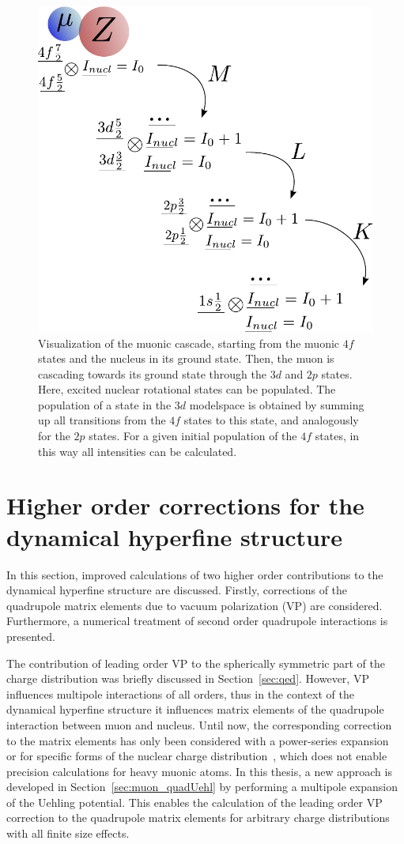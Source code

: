 %
\begin{figure}%
\centering
\includegraphics[width=0.82\linewidth]{pics/cascade.pdf}%
\caption{Visualization of the muonic cascade, starting from the muonic $4f$ states and the nucleus in its ground state. Then, the muon is cascading towards its ground state through the $3d$ and $2p$ states. Here, excited nuclear rotational states can be populated. The population of a state in the $3d$ modelspace is obtained by summing up all transitions from the $4f$ states to this state, and analogously for the $2p$ states. For a given initial population of the $4f$ states, in this way all intensities can be calculated.}%
\label{fig:cascade}%
\end{figure}
%
\newpage
\section{Higher order corrections for the dynamical hyperfine structure}
\label{sec:higherorder}
In this section, improved calculations of two higher order contributions to the dynamical hyperfine structure are discussed. Firstly, corrections of the quadrupole matrix elements due to vacuum polarization (VP) are considered. Furthermore, a numerical treatment of second order quadrupole interactions is presented.

The contribution of leading order VP to the spherically symmetric part of the charge distribution was briefly discussed in Section~\ref{sec:qed}. However, VP influences multipole interactions of all orders, thus in the context of the dynamical hyperfine structure it influences matrix elements of the quadrupole interaction between muon and nucleus. Until now, the corresponding correction to the matrix elements has only been considered with a power-series expansion~\cite{Fricke1969vp,zehnder1975} or for specific forms of the nuclear charge distribution~\cite{pearson1963}, which does not enable precision calculations for heavy muonic atoms. In this thesis, a new approach is developed in Section~\ref{sec:muon_quadUehl} by performing a multipole expansion of the Uehling potential. This enables the calculation of the leading order VP correction to the quadrupole matrix elements for arbitrary charge distributions with all finite size effects.

